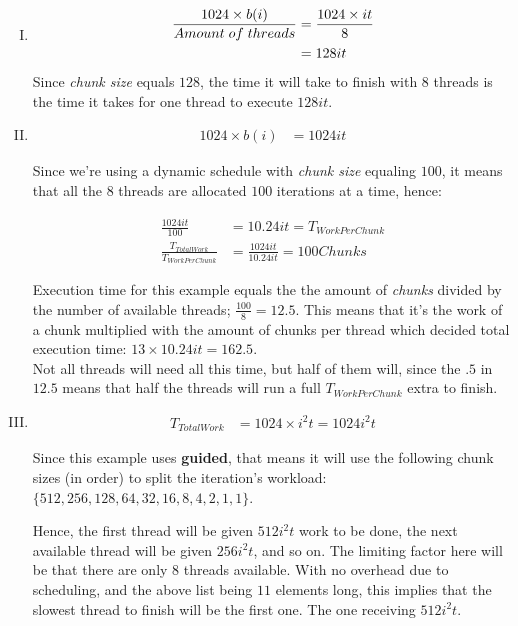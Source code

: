 \documentclass[fontsize=11pt, paper=a4, titlepage]{article}
\begin{document}
\begin{enumerate}[a)]
\begin{enumerate}[I)]
        \item\begin{align*}
            \frac{1024\times b(i)}{Amount\thickspace of\thickspace threads} &=
            \frac{1024\times it}{8}\\
            &= 128it
        \end{align*}
        Since \textit{chunk size} equals $128$, the time it will take to finish
with $8$ threads is the time it takes for one thread to execute $128it$.

        \item\begin{align*}
            1024\times b(i) &= 1024it
        \end{align*}

        Since we're using a dynamic schedule  with \textit{chunk size} equaling
$100$, it means that all the $8$ threads are allocated $100$ iterations at a
time, hence:

        \begin{align*}
            \frac{1024it}{100} &= 10.24it = T_{WorkPerChunk}\\
            \frac{T_{TotalWork}}{T_{WorkPerChunk}} &= \frac{1024it}{10.24it} = 100 Chunks
        \end{align*}

        Execution time for this example equals the the amount of \textit{chunks}
divided by the number of available threads; $\frac{100}{8}= 12.5$. This means
that it's the work of a chunk multiplied with the amount of chunks per thread
which decided total execution time: $13\times 10.24it = 162.5$. \\

Not all threads will need all this time, but half of them will, since the $.5$
in $12.5$ means that half the threads will run a full $T_{WorkPerChunk}$ extra
to finish.

        \item\begin{align*}
            T_{TotalWork} &= 1024\times i^2t = 1024i^2t
        \end{align*}

        Since this example uses \textbf{guided}, that means it will use the
following chunk sizes (in order) to split the iteration's workload: $\{512, 256,
128, 64, 32, 16, 8, 4, 2, 1, 1\}$.

Hence, the first thread will be given $512i^2t$ work to be done, the next
available thread will be given $256i^2t$, and so on. The limiting factor here
will be that there are only $8$ threads available. With no overhead due to
scheduling, and the above list being $11$ elements long, this implies that the
slowest thread to finish will be the first one. The one receiving $512i^2t$. \\



\end{enumerate}
\end{enumerate}
\end{document}
